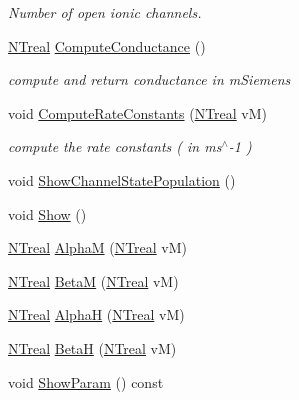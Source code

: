 \begin{DoxyCompactItemize}
\begin{DoxyCompactList}\small\item\em Number of open ionic channels. \item\end{DoxyCompactList}\item 
\hyperlink{nt__types_8h_a814a97893e9deb1eedcc7604529ba80d}{NTreal} \hyperlink{class_n_t_b_p__hranvier__sodium__multi__current__o_a4d8d8e986bf5b84801b8f7a04a9e83b5}{ComputeConductance} ()
\begin{DoxyCompactList}\small\item\em compute and return conductance in mSiemens \item\end{DoxyCompactList}\item 
void \hyperlink{class_n_t_b_p__hranvier__sodium__multi__current__o_a0b059aca1199c04700946823622f460c}{ComputeRateConstants} (\hyperlink{nt__types_8h_a814a97893e9deb1eedcc7604529ba80d}{NTreal} vM)
\begin{DoxyCompactList}\small\item\em compute the rate constants ( in ms$^\wedge$-\/1 ) \item\end{DoxyCompactList}\item 
void \hyperlink{class_n_t_b_p__hranvier__sodium__multi__current__o_ae18b5c28d28cc6b58d2343925c232a31}{ShowChannelStatePopulation} ()
\item 
void \hyperlink{class_n_t_b_p__hranvier__sodium__multi__current__o_a1cb37d5a2fc52387d2ecff5379faf0d4}{Show} ()
\item 
\hyperlink{nt__types_8h_a814a97893e9deb1eedcc7604529ba80d}{NTreal} \hyperlink{class_n_t_b_p__hranvier__sodium__multi__current__o_a98288a213bc804337dbad0585e9139ec}{AlphaM} (\hyperlink{nt__types_8h_a814a97893e9deb1eedcc7604529ba80d}{NTreal} vM)
\item 
\hyperlink{nt__types_8h_a814a97893e9deb1eedcc7604529ba80d}{NTreal} \hyperlink{class_n_t_b_p__hranvier__sodium__multi__current__o_a01f714309861942210cb8b50aadf6569}{BetaM} (\hyperlink{nt__types_8h_a814a97893e9deb1eedcc7604529ba80d}{NTreal} vM)
\item 
\hyperlink{nt__types_8h_a814a97893e9deb1eedcc7604529ba80d}{NTreal} \hyperlink{class_n_t_b_p__hranvier__sodium__multi__current__o_a074fe0e8939e1fd62e447443d506cbbb}{AlphaH} (\hyperlink{nt__types_8h_a814a97893e9deb1eedcc7604529ba80d}{NTreal} vM)
\item 
\hyperlink{nt__types_8h_a814a97893e9deb1eedcc7604529ba80d}{NTreal} \hyperlink{class_n_t_b_p__hranvier__sodium__multi__current__o_af3dbadd116cfeba83f0ccfc9057cff74}{BetaH} (\hyperlink{nt__types_8h_a814a97893e9deb1eedcc7604529ba80d}{NTreal} vM)
\item 
void \hyperlink{class_n_t_b_p__hranvier__sodium__multi__current__o_a0688557f698752ae3b074d20740be880}{ShowParam} () const 
\end{DoxyCompactItemize}


